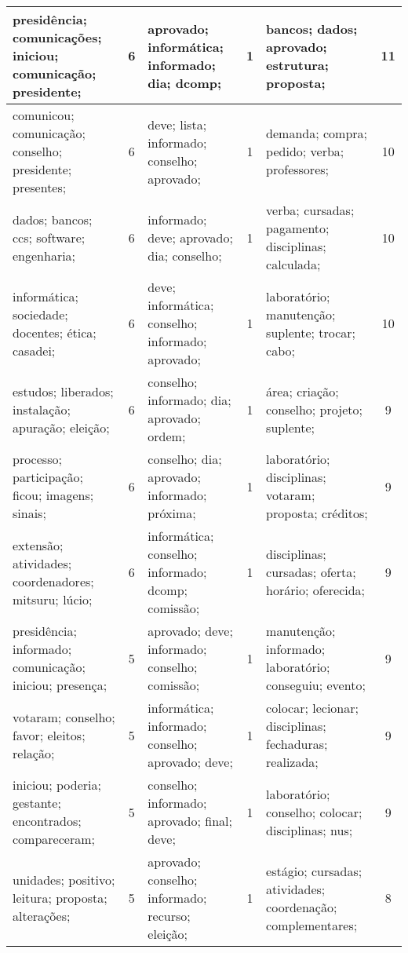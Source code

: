\begin{table}[!h]
\begin{tabular}{|l|c||l|c||l|c|}
   presidência; comunicações; iniciou; comunicação; presidente;    &   6  &         aprovado; informática; informado; dia; dcomp;    &   1  &       bancos; dados; aprovado; estrutura; proposta;    &   11  \\ \hline
   comunicou; comunicação; conselho; presidente; presentes;    &   6  &         deve; lista; informado; conselho; aprovado;    &   1  &       demanda; compra; pedido; verba; professores;    &   10  \\ \hline
   dados; bancos; ccs; software; engenharia;    &   6  &         informado; deve; aprovado; dia; conselho;    &   1  &       verba; cursadas; pagamento; disciplinas; calculada;    &   10  \\ \hline
   informática; sociedade; docentes; ética; casadei;    &   6  &         deve; informática; conselho; informado; aprovado;    &   1  &       laboratório; manutenção; suplente; trocar; cabo;    &   10  \\ \hline
   estudos; liberados; instalação; apuração; eleição;    &   6  &         conselho; informado; dia; aprovado; ordem;    &   1  &       área; criação; conselho; projeto; suplente;    &   9  \\ \hline
   processo; participação; ficou; imagens; sinais;    &   6  &         conselho; dia; aprovado; informado; próxima;    &   1  &       laboratório; disciplinas; votaram; proposta; créditos;    &   9  \\ \hline
   extensão; atividades; coordenadores; mitsuru; lúcio;    &   6  &         informática; conselho; informado; dcomp; comissão;    &   1  &       disciplinas; cursadas; oferta; horário; oferecida;    &   9  \\ \hline
   presidência; informado; comunicação; iniciou; presença;    &   5  &         aprovado; deve; informado; conselho; comissão;    &   1  &       manutenção; informado; laboratório; conseguiu; evento;    &   9  \\ \hline
   votaram; conselho; favor; eleitos; relação;    &   5  &         informática; informado; conselho; aprovado; deve;    &   1  &       colocar; lecionar; disciplinas; fechaduras; realizada;    &   9  \\ \hline
   iniciou; poderia; gestante; encontrados; compareceram;    &   5  &         conselho; informado; aprovado; final; deve;    &   1  &       laboratório; conselho; colocar; disciplinas; nus;    &   9  \\ \hline
   unidades; positivo; leitura; proposta; alterações;    &   5  &         aprovado; conselho; informado; recurso; eleição;    &   1  &       estágio; cursadas; atividades; coordenação; complementares;    &   8  \\ \hline

\end{tabular}
\end{table}
